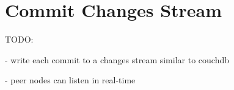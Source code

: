 
\section{Commit Changes Stream}
\label{main.diff-across-commits}

TODO:

- write each commit to a changes stream similar to couchdb

- peer nodes can listen in real-time